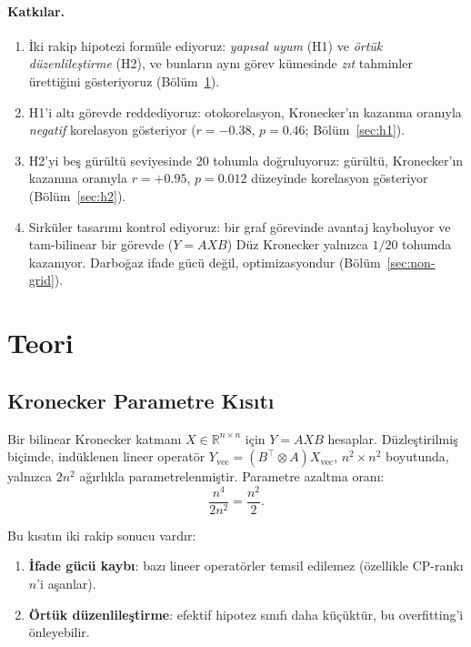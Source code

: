 \documentclass[11pt,a4paper]{article}
\begin{document}
\paragraph{Katkılar.}
\begin{enumerate}
\item İki rakip hipotezi formüle ediyoruz: \emph{yapısal uyum}
(H1) ve \emph{örtük düzenlileştirme} (H2), ve bunların aynı
görev kümesinde \emph{zıt} tahminler ürettiğini gösteriyoruz
(Bölüm~\ref{sec:theory}).
\item H1'i altı görevde reddediyoruz: otokorelasyon, Kronecker'ın
kazanma oranıyla \emph{negatif} korelasyon gösteriyor
($r = -0.38$, $p = 0.46$; Bölüm~\ref{sec:h1}).
\item H2'yi beş gürültü seviyesinde 20 tohumla doğruluyoruz:
gürültü, Kronecker'ın kazanma oranıyla $r = +0.95$,
$p = 0.012$ düzeyinde korelasyon gösteriyor
(Bölüm~\ref{sec:h2}).
\item Sirküler tasarımı kontrol ediyoruz: bir graf görevinde
avantaj kayboluyor ve tam-bilinear bir görevde ($Y = AXB$)
Düz Kronecker yalnızca $1/20$ tohumda kazanıyor. Darboğaz
ifade gücü değil, optimizasyondur (Bölüm~\ref{sec:non-grid}).
\end{enumerate}


\section{Teori}
\label{sec:theory}

\subsection{Kronecker Parametre Kısıtı}
\label{sec:constraint}

Bir bilinear Kronecker katmanı $X \in \mathbb{R}^{n \times n}$ için
$Y = A X B$ hesaplar. Düzleştirilmiş biçimde, indüklenen lineer
operatör $Y_{\text{vec}} = (B^\top \otimes A) X_{\text{vec}}$,
$n^2 \times n^2$ boyutunda, yalnızca $2n^2$ ağırlıkla
parametrelenmiştir. Parametre azaltma oranı:
\begin{equation}
\frac{n^4}{2n^2} = \frac{n^2}{2}.
\label{eq:reduction}
\end{equation}

Bu kısıtın iki rakip sonucu vardır:
\begin{enumerate}
\item \textbf{İfade gücü kaybı}: bazı lineer operatörler temsil
edilemez (özellikle CP-rankı $n$'i aşanlar).
\item \textbf{Örtük düzenlileştirme}: efektif hipotez sınıfı daha
küçüktür, bu overfitting'i önleyebilir.
\end{enumerate}
\end{document}
